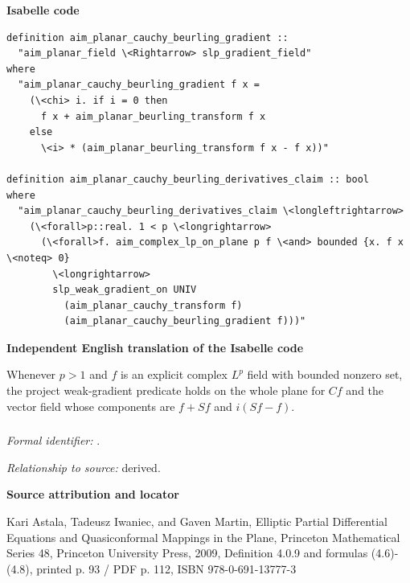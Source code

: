 \documentclass[10pt,oneside]{article}
\newcommand{\reviewlabel}[1]{\par\smallskip\noindent\textsf{\bfseries #1}\par\smallskip}
\begin{document}
\reviewlabel{Isabelle code}
\begin{lstlisting}
definition aim_planar_cauchy_beurling_gradient ::
  "aim_planar_field \<Rightarrow> slp_gradient_field"
where
  "aim_planar_cauchy_beurling_gradient f x =
    (\<chi> i. if i = 0 then
      f x + aim_planar_beurling_transform f x
    else
      \<i> * (aim_planar_beurling_transform f x - f x))"

definition aim_planar_cauchy_beurling_derivatives_claim :: bool
where
  "aim_planar_cauchy_beurling_derivatives_claim \<longleftrightarrow>
    (\<forall>p::real. 1 < p \<longrightarrow>
      (\<forall>f. aim_complex_lp_on_plane p f \<and> bounded {x. f x \<noteq> 0}
        \<longrightarrow>
        slp_weak_gradient_on UNIV
          (aim_planar_cauchy_transform f)
          (aim_planar_cauchy_beurling_gradient f)))"
\end{lstlisting}

\reviewlabel{Independent English translation of the Isabelle code}
Whenever $p>1$ and $f$ is an explicit complex $L^p$ field with bounded nonzero set, the project weak-gradient predicate holds on the whole plane for $Cf$ and the vector field whose components are $f+Sf$ and $i(Sf-f)$.

\subsubsection{\texttt{}}
\noindent\textit{Formal identifier:} \texttt{}.\par
\noindent\textit{Relationship to source:} derived.

\reviewlabel{Source attribution and locator}
Kari Astala, Tadeusz Iwaniec, and Gaven Martin, Elliptic Partial Differential Equations and Quasiconformal Mappings in the Plane, Princeton Mathematical Series 48, Princeton University Press, 2009, Definition 4.0.9 and formulas (4.6)-(4.8), printed p. 93 / PDF p. 112, ISBN 978-0-691-13777-3
\end{document}
